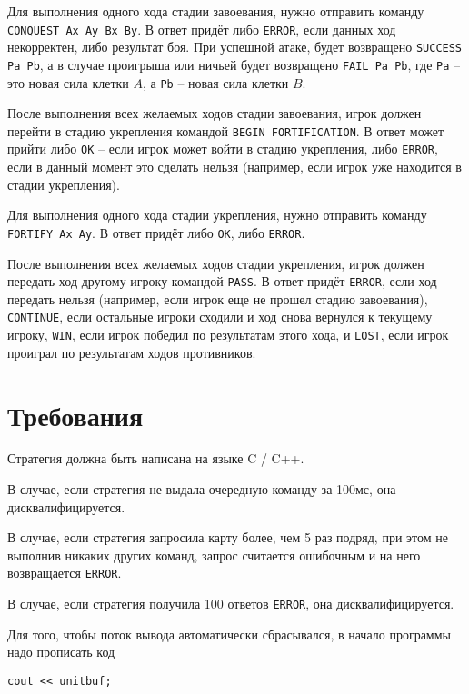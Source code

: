 \documentclass[12pt, a4paper]{article}
\begin{document}
Для выполнения одного хода стадии завоевания, нужно отправить команду \texttt{CONQUEST Ax Ay Bx By}. В ответ придёт либо \texttt{ERROR}, если данных ход некорректен, либо результат боя. При успешной атаке, будет возвращено \texttt{SUCCESS Pa Pb}, а в случае проигрыша или ничьей будет возвращено \texttt{FAIL Pa Pb}, где \texttt{Pa} -- это новая сила клетки $A$, а \texttt{Pb} -- новая сила клетки $B$.

После выполнения всех желаемых ходов стадии завоевания, игрок должен перейти в стадию укрепления командой \texttt{BEGIN FORTIFICATION}. В ответ может прийти либо \texttt{OK} -- если игрок может войти в стадию укрепления, либо \texttt{ERROR}, если в данный момент это сделать нельзя (например, если игрок уже находится в стадии укрепления).

Для выполнения одного хода стадии укрепления, нужно отправить команду \texttt{FORTIFY Ax Ay}. В ответ придёт либо \texttt{OK}, либо \texttt{ERROR}.

После выполнения всех желаемых ходов стадии укрепления, игрок должен передать ход другому игроку командой \texttt{PASS}. В ответ придёт \texttt{ERROR}, если ход передать нельзя (например, если игрок еще не прошел стадию завоевания), \texttt{CONTINUE}, если остальные игроки сходили и ход снова вернулся к текущему игроку, \texttt{WIN}, если игрок победил по результатам этого хода, и \texttt{LOST}, если игрок проиграл по результатам ходов противников.



{\section{Требования}}

Стратегия должна быть написана на языке C / C++.

В случае, если стратегия не выдала очередную команду за 100мс, она дисквалифицируется.

В случае, если стратегия запросила карту более, чем 5 раз подряд, при этом не выполнив никаких других команд, запрос считается ошибочным и на него возвращается \texttt{ERROR}.

В случае, если стратегия получила 100 ответов \texttt{ERROR}, она дисквалифицируется.

Для того, чтобы поток вывода автоматически сбрасывался, в начало программы надо прописать код
\begin{verbatim}
cout << unitbuf;
\end{verbatim}
\end{document}
